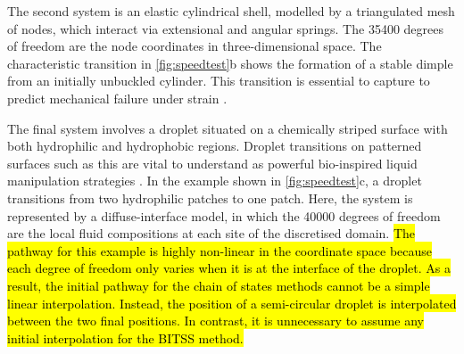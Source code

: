\documentclass[aip,jcp,reprint,twocolumn]{revtex4-1}
\begin{document}
The second system is an elastic cylindrical shell, modelled by a triangulated mesh of nodes, which interact via extensional and angular springs.
The \num{35400} degrees of freedom are the node coordinates in three-dimensional space.
The characteristic transition in \cref{fig:speedtest}b shows the formation of a stable dimple from an initially unbuckled cylinder.
This transition is essential to capture to predict mechanical failure under strain \cite{Panter2019,Virot2017}.

The final system involves a droplet situated on a chemically striped surface with both hydrophilic and hydrophobic regions.
Droplet transitions on patterned surfaces such as this are vital to understand as powerful bio-inspired liquid manipulation strategies  \cite{Kusumaatmaja2006,Brown2016}.
In the example shown in \cref{fig:speedtest}c, a droplet transitions from two hydrophilic patches to one patch.
Here, the system is represented by a diffuse-interface model, in which the \num{40000} degrees of freedom are the local fluid compositions at each site of the discretised domain.
\hl{The pathway for this example is highly non-linear in the coordinate space because each degree of freedom only varies when it is at the interface of the droplet.
As a result, the initial pathway for the chain of states methods cannot be a simple linear interpolation.
Instead, the position of a semi-circular droplet is interpolated between the two final positions.
In contrast, it is unnecessary to assume any initial interpolation for the BITSS method.}
\end{document}
